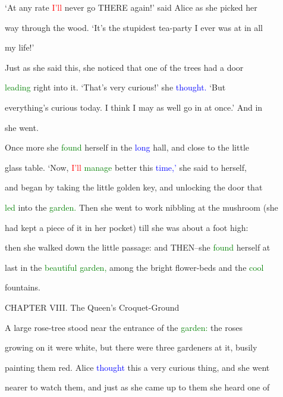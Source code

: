  ‘At any rate \textcolor{red}{I’ll} never go THERE again!’ said Alice as she picked her

 way through the wood. ‘It’s the stupidest tea-party I ever was at in all

 my life!’



 Just as she said this, she noticed that one of the \textcolor{BurntOrange}{trees} had a door

 \textcolor{green}{leading} right into it. ‘That’s very curious!’ she \textcolor{blue}{thought.} ‘But

 everything’s curious today. I think I may as well go in at once.’ And in

 she went.



 Once more she \textcolor{green}{found} herself in the \textcolor{blue}{long} hall, and close to the little

 glass table. ‘Now, \textcolor{red}{I’ll} \textcolor{green}{manage} better this \textcolor{blue}{time,’} she said to herself,

 and began by taking the little golden key, and unlocking the door that

 \textcolor{green}{led} into the \textcolor{green}{garden.} Then she went to work nibbling at the mushroom (she

 had kept a piece of it in her pocket) till she was about a foot high:

 then she walked down the little passage: and THEN--she \textcolor{green}{found} herself at

 last in the \textcolor{green}{beautiful} \textcolor{green}{garden,} among the bright flower-beds and the \textcolor{green}{cool}

 fountains.









 CHAPTER VIII. The Queen’s Croquet-Ground



 A large rose-tree stood near the entrance of the \textcolor{green}{garden:} the roses

 \textcolor{BurntOrange}{growing} on it were \textcolor{BurntOrange}{white,} but there were three gardeners at it, busily

 painting them red. Alice \textcolor{blue}{thought} this a very curious thing, and she went

 nearer to \textcolor{BurntOrange}{watch} them, and just as she came up to them she heard one of

